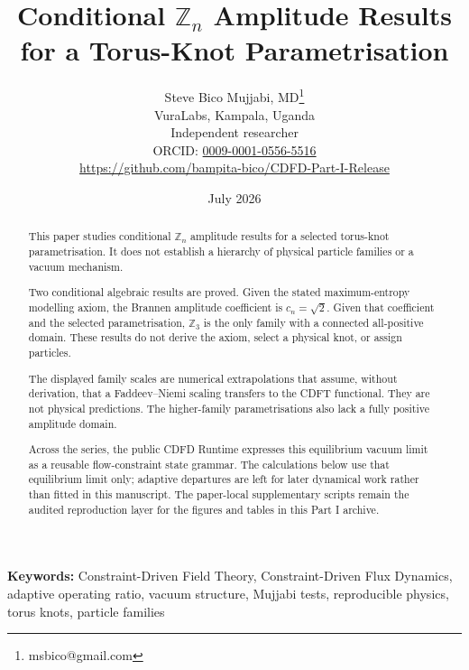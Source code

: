 \documentclass[11pt]{article}
\begin{document}
\title{Conditional $\mathbb{Z}_n$ Amplitude Results for a Torus-Knot Parametrisation}

\author{Steve Bico Mujjabi, MD\thanks{msbico@gmail.com}\\
VuraLabs, Kampala, Uganda\\
Independent researcher\\
ORCID: \href{https://orcid.org/0009-0001-0556-5516}{0009-0001-0556-5516}\\
\url{https://github.com/bampita-bico/CDFD-Part-I-Release}}

\date{July 2026}

\maketitle

\begin{abstract}
This paper studies conditional $\mathbb{Z}_n$ amplitude results for a selected
torus-knot parametrisation. It does not establish a hierarchy of physical
particle families or a vacuum mechanism.

Two conditional algebraic results are proved. Given the stated
maximum-entropy modelling axiom, the Brannen amplitude coefficient is
$c_n=\sqrt{2}$. Given that coefficient and the selected parametrisation,
$\mathbb{Z}_3$ is the only family with a connected all-positive domain. These
results do not derive the axiom, select a physical knot, or assign particles.

The displayed family scales are numerical extrapolations that assume, without
derivation, that a Faddeev--Niemi scaling transfers to the CDFT functional.
They are not physical predictions. The higher-family parametrisations also lack
a fully positive amplitude domain.

Across the series, the public CDFD Runtime expresses this equilibrium vacuum
limit as a reusable flow-constraint state grammar. The calculations below use
that equilibrium limit only; adaptive departures are left for later dynamical
work rather than fitted in this manuscript. The paper-local supplementary
scripts remain the audited reproduction layer for the figures and tables in
this Part I archive.
\end{abstract}

\noindent\textbf{Keywords:} Constraint-Driven Field Theory, Constraint-Driven Flux Dynamics, adaptive operating ratio, vacuum structure, Mujjabi tests, reproducible physics, torus knots, particle families

\vspace{0.75em}
\linenumbers
\end{document}
